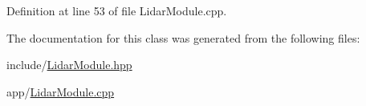 Definition at line 53 of file Lidar\+Module.\+cpp.



The documentation for this class was generated from the following files\+:\begin{DoxyCompactItemize}
\item 
include/\hyperlink{_lidar_module_8hpp}{Lidar\+Module.\+hpp}\item 
app/\hyperlink{_lidar_module_8cpp}{Lidar\+Module.\+cpp}\end{DoxyCompactItemize}
